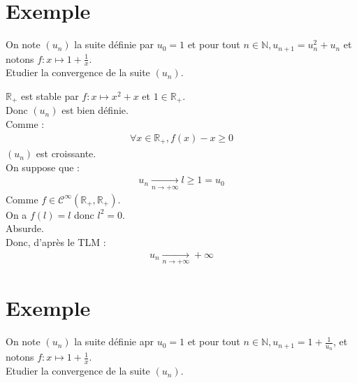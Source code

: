 \documentclass[../main.tex]{subfiles}
\begin{document}
\setcounter{section}{67}
\section{Exemple}
\begin{tcolorbox}[title=Exemple 14.68, title filled=false, colframe=darkgreen, colback=darkgreen!10!white]
    On note $(u_n)$ la suite définie par $u_0 = 1$ et pour tout $n \in \mathbb{N}, u_{n+1} = u_n^2 + u_n$ et notons $f:x\mapsto 1+\frac{1}{x}$. \\
    Etudier la convergence de la suite $(u_n)$. 
\end{tcolorbox}

$\mathbb{R}_+$ est stable par $f:x \mapsto x^2 + x$ et $1 \in \mathbb{R}_+$. \\
Donc $(u_n)$ est bien définie. \\
Comme : 
\begin{align*}
    \forall x \in \mathbb{R}_+, f(x) - x \geq 0
\end{align*}
$(u_n)$ est croissante. \\
On suppose que : 
\begin{align*}
    u_n \underset{n \to +\infty}{\longrightarrow} l \geq 1 = u_0
\end{align*}
Comme $f \in \mathcal{C}^{\infty}(\mathbb{R}_+, \mathbb{R}_+)$. \\
On a $f(l) = l$ donc $l^2 = 0$. \\
Absurde. \\
Donc, d'après le TLM : 
\begin{align*}
    u_n \underset{n \to +\infty}{\longrightarrow} +\infty
\end{align*}

\section{Exemple}
\begin{tcolorbox}[title=Exemple 14.69, title filled=false, colframe=darkgreen, colback=darkgreen!10!white]
    On note $(u_n)$ la suite définie apr $u_0 = 1$ et pour tout $n \in \mathbb{N}, u_{n+1} = 1 + \frac{1}{u_n}$, et notons $f:x\mapsto 1 + \frac{1}{x}$. \\
    Etudier la convergence de la suite $(u_n)$. 
\end{tcolorbox}
\end{document}
